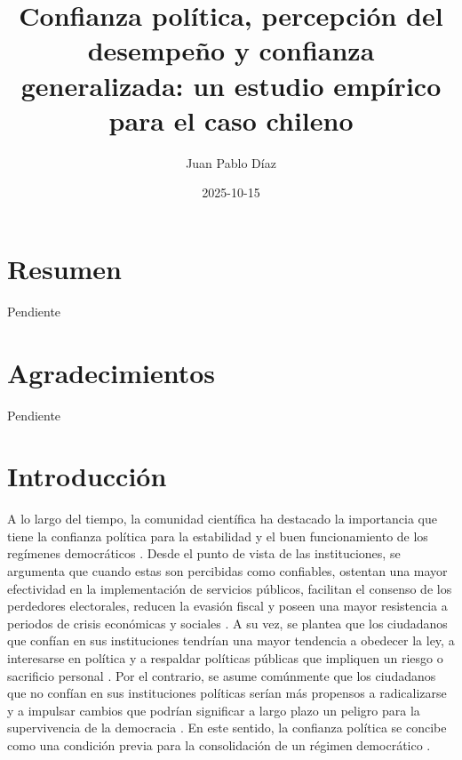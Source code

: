 \documentclass[12pt,twoside]{templates/facsothesis}
\title{Confianza política, percepción del desempeño y confianza generalizada: un estudio empírico para el caso chileno}
\author{Juan Pablo Díaz}
\date{2025-10-15}
\begin{document}

  \maketitle

\frontmatter %
\pagestyle{empty} %



  \setcounter{tocdepth}{1}
  \setlength{\parskip}{0pt}
  \tableofcontents

\setlength\parskip{1em plus 0.1em minus 0.2em}

  \listoftables

  \listoffigures



\mainmatter %
\pagestyle{fancyplain} %

\chapter*{Resumen}\label{resumen}

Pendiente

\chapter*{Agradecimientos}\label{agradecimientos}

Pendiente

\chapter{Introducción}\label{introducciuxf3n}

A lo largo del tiempo, la comunidad científica ha destacado la importancia que tiene la confianza política para la estabilidad y el buen funcionamiento de los regímenes democráticos \citep{zmerliPoliticalTrust2022}. Desde el punto de vista de las instituciones, se argumenta que cuando estas son percibidas como confiables, ostentan una mayor efectividad en la implementación de servicios públicos, facilitan el consenso de los perdedores electorales, reducen la evasión fiscal y poseen una mayor resistencia a periodos de crisis económicas y sociales \citep{vandermeerDeeplyRootedConcern2017, newtonSocialPoliticalTrust2017, citrinPoliticalTrustCynical2018}. A su vez, se plantea que los ciudadanos que confían en sus instituciones tendrían una mayor tendencia a obedecer la ley, a interesarse en política y a respaldar políticas públicas que impliquen un riesgo o sacrificio personal \citep{citrinPoliticalTrustCynical2018, zmerliPoliticalTrust2022}. Por el contrario, se asume comúnmente que los ciudadanos que no confían en sus instituciones políticas serían más propensos a radicalizarse y a impulsar cambios que podrían significar a largo plazo un peligro para la supervivencia de la democracia \citep{andersonSensitiveLeftImpervious2008}. En este sentido, la confianza política se concibe como una condición previa para la consolidación de un régimen democrático \citep{vandermeerDeeplyRootedConcern2017}.
\end{document}
